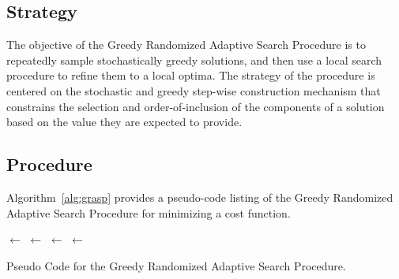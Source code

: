 \subsection{Strategy}
The objective of the Greedy Randomized Adaptive Search Procedure is to repeatedly sample stochastically greedy solutions, and then use a local search procedure to refine them to a local optima.
The strategy of the procedure is centered on the stochastic and greedy step-wise construction mechanism that constrains the selection and order-of-inclusion of the components of a solution based on the value they are expected to provide.

\subsection{Procedure}
Algorithm~\ref{alg:grasp} provides a pseudo-code listing of the Greedy Randomized Adaptive Search Procedure for minimizing a cost function.

\begin{algorithm}[ht]
	\SetLine
	\KwIn{\Alpha}
	\KwOut{\Best}
	\Best $\leftarrow$ \ConstructRandomSolution{}\;
	\While{$\neg$ \StopCondition{}} {
		\Candidate $\leftarrow$ \GreedyRandomizedConstruction{\Alpha}\;
		\Candidate $\leftarrow$ \LocalSearch{\Candidate}\;
		\If{\Cost{\Candidate} $<$ \Cost{\Best}} {
			\Best $\leftarrow$ \Candidate\;
		}
	}
	\Return{\Best}\;
	\caption{Pseudo Code for the Greedy Randomized Adaptive Search Procedure.}
	\label{alg:grasp}
\end{algorithm}

